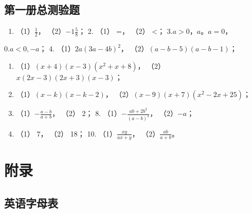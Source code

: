 \section{第一册总测验题}

\begin{enumerate}
\item
  （1）\(\frac{1}{2}\)， （2）\(-1\frac{5}{8}\)； 2. （1） =， （2）
  \textless； 3.\(a > 0\)，\(a\)。\(a = 0\)，
\end{enumerate}

0.\(a < 0, -a\)； 4. （1）\(2a(3a - 4b)^2\)，
（2）\((a - b - 5)(a - b - 1)\)；

\begin{enumerate}[start=5]
\item
  （1）\((x + 4)(x - 3)(x^2 + x + 8)\)，
  （2）\(x(2x - 3)(2x + 3)(x - 3)\)；
\item
  （1）\((x - k)(x - k - 2)\)， （2）\((x - 9)(x + 7)(x^2 - 2x + 25)\)；
\item
  （1）\(-\frac{a - b}{a + b}\)， （2） 2； 8.
  （1）\(-\frac{ab + 2b^2}{(a - b)^2}\)， （2）\(-a\)；
\item
  （1） 7， （2） 18； 10. （1）\(\frac{xy}{ax + y}\)，
  （2）\(\frac{ab}{a + b}\)。
\end{enumerate}

\chapter{附录}

\section{英语字母表}

